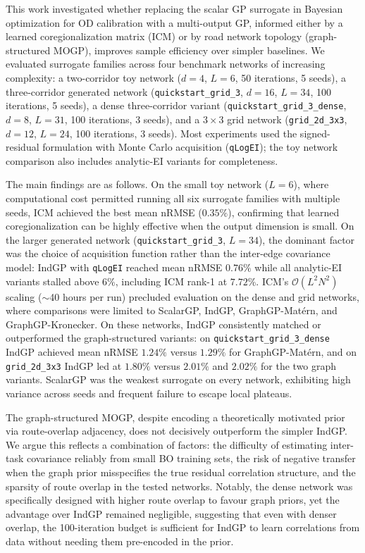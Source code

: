 \documentclass[11pt]{article}
\begin{document}
This work investigated whether replacing the scalar GP surrogate in Bayesian optimization for OD calibration with a multi-output GP, informed either by a learned coregionalization matrix (ICM) or by road network topology (graph-structured MOGP), improves sample efficiency over simpler baselines. We evaluated surrogate families across four benchmark networks of increasing complexity: a two-corridor toy network ($d=4$, $L=6$, 50 iterations, 5 seeds), a three-corridor generated network (\texttt{quickstart\_grid\_3}, $d=16$, $L=34$, 100 iterations, 5 seeds), a dense three-corridor variant (\texttt{quickstart\_grid\_3\_dense}, $d=8$, $L=31$, 100 iterations, 3 seeds), and a $3\times3$ grid network (\texttt{grid\_2d\_3x3}, $d=12$, $L=24$, 100 iterations, 3 seeds). Most experiments used the signed-residual formulation with Monte Carlo acquisition (\texttt{qLogEI}); the toy network comparison also includes analytic-EI variants for completeness.

The main findings are as follows. On the small toy network ($L=6$), where computational cost permitted running all six surrogate families with multiple seeds, ICM achieved the best mean nRMSE ($0.35\%$), confirming that learned coregionalization can be highly effective when the output dimension is small. On the larger generated network (\texttt{quickstart\_grid\_3}, $L=34$), the dominant factor was the choice of acquisition function rather than the inter-edge covariance model: IndGP with \texttt{qLogEI} reached mean nRMSE $0.76\%$ while all analytic-EI variants stalled above $6\%$, including ICM rank-1 at $7.72\%$. ICM's $\mathcal{O}(L^2 N^2)$ scaling ($\sim$40 hours per run) precluded evaluation on the dense and grid networks, where comparisons were limited to ScalarGP, IndGP, GraphGP-Mat\'ern, and GraphGP-Kronecker. On these networks, IndGP consistently matched or outperformed the graph-structured variants: on \texttt{quickstart\_grid\_3\_dense} IndGP achieved mean nRMSE $1.24\%$ versus $1.29\%$ for GraphGP-Mat\'ern, and on \texttt{grid\_2d\_3x3} IndGP led at $1.80\%$ versus $2.01\%$ and $2.02\%$ for the two graph variants. ScalarGP was the weakest surrogate on every network, exhibiting high variance across seeds and frequent failure to escape local plateaus.

The graph-structured MOGP, despite encoding a theoretically motivated prior via route-overlap adjacency, does not decisively outperform the simpler IndGP. We argue this reflects a combination of factors: the difficulty of estimating inter-task covariance reliably from small BO training sets, the risk of negative transfer when the graph prior misspecifies the true residual correlation structure, and the sparsity of route overlap in the tested networks. Notably, the dense network was specifically designed with higher route overlap to favour graph priors, yet the advantage over IndGP remained negligible, suggesting that even with denser overlap, the 100-iteration budget is sufficient for IndGP to learn correlations from data without needing them pre-encoded in the prior.
\end{document}
